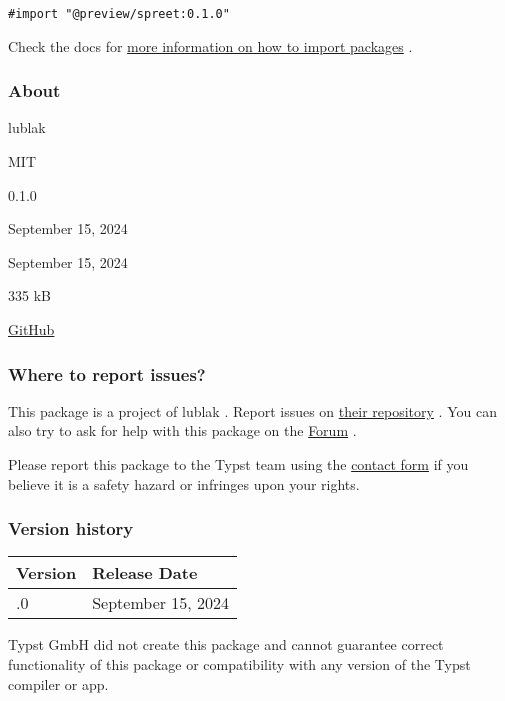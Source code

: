 \begin{verbatim}
#import "@preview/spreet:0.1.0"
\end{verbatim}



Check the docs for
\href{https://typst.app/docs/reference/scripting/\#packages}{more
information on how to import packages} .

\subsubsection{About}\label{about}

\begin{description}
\tightlist
\item[Author :]
lublak
\item[License:]
MIT
\item[Current version:]
0.1.0
\item[Last updated:]
September 15, 2024
\item[First released:]
September 15, 2024
\item[Archive size:]
335 kB
\href{https://packages.typst.org/preview/spreet-0.1.0.tar.gz}{\pandocbounded{}}
\item[Repository:]
\href{https://github.com/lublak/typst-spreet-package}{GitHub}
\end{description}

\subsubsection{Where to report issues?}\label{where-to-report-issues}

This package is a project of lublak . Report issues on
\href{https://github.com/lublak/typst-spreet-package}{their repository}
. You can also try to ask for help with this package on the
\href{https://forum.typst.app}{Forum} .

Please report this package to the Typst team using the
\href{https://typst.app/contact}{contact form} if you believe it is a
safety hazard or infringes upon your rights.

\label{versions}
\subsubsection{Version history}\label{version-history}

\begin{longtable}[]{@{}ll@{}}
\toprule\noalign{}
Version & Release Date \\
\midrule\noalign{}
\endhead
\bottomrule\noalign{}
\endlastfoot
0.1.0 & September 15, 2024 \\
\end{longtable}

Typst GmbH did not create this package and cannot guarantee correct
functionality of this package or compatibility with any version of the
Typst compiler or app.
